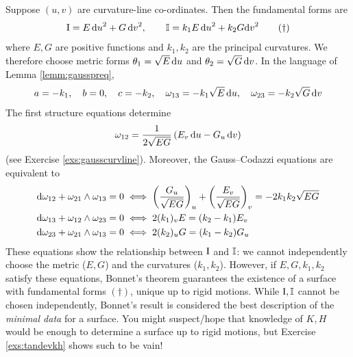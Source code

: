  
 Suppose $(u,v)$ are curvature-line co-ordinates. Then the fundamental forms are
\[
	\mathrm{I}=E\,{\mathrm{d} u}^2+G\,{\mathrm{d} v}^2,\qquad \mathbb{I}=k_1E\,{\mathrm{d} u}^2+k_2 G{\mathrm{d} v}^2\tag{$\dag$}
\]
where $E,G$ are positive functions and $k_1,k_2$ are the principal curvatures. We therefore choose metric forms $\theta_1=\sqrt E\,{\mathrm{d} u}$ and $\theta_2=\sqrt G\,{\mathrm{d} v}$. In the language of Lemma \ref{lemm:gausspreq},
\[
	a=-k_1,\quad b=0,\quad c=-k_2,\quad \omega_{13}=-k_1\sqrt E\,{\mathrm{d} u},\quad\omega_{23}=-k_2\sqrt G\,{\mathrm{d} v}
\]
The first structure equations determine 
\[
	\omega_{12}= \frac 1{2\sqrt{EG}}\left(E_v\,{\mathrm{d} u} -G_u\,{\mathrm{d} v}\right)
\]
(see Exercise \ref{exs:gausscurvline}). Moreover, the Gauss--Codazzi equations are equivalent to
\begin{align*}
	\mathrm{d}\omega_{12}+\omega_{21}\wedge\omega_{13}=0&\iff \left(\frac{G_u}{\sqrt{EG}}\right)_u+\left(\frac{E_v}{\sqrt{EG}}\right)_v =-2k_1k_2\sqrt{EG}\\
	\mathrm{d}\omega_{13}+\omega_{12}\wedge\omega_{23}=0&\iff 2(k_1)_vE=(k_2-k_1)E_v\\
	\mathrm{d}\omega_{23}+\omega_{21}\wedge\omega_{13}=0&\iff 2(k_2)_uG=(k_1-k_2)G_u
\end{align*}
These equations show the relationship between $\mathrm{I}$ and $\mathbb{I}$: we cannot independently choose the metric ($E,G$) and the curvatures ($k_1,k_2$). However, if $E,G,k_1,k_2$ satisfy these equations, Bonnet's theorem guarantees the existence of a surface with fundamental forms $(\dag)$, unique up to rigid motions.\smallbreak
While $\mathrm{I},\mathbb{I}$ cannot be chosen independently, Bonnet's result is considered the best description of the \emph{minimal data} for a surface. You might suspect/hope that knowledge of $K,H$ would be enough to determine a surface up to rigid motions, but Exercise \ref{exs:tandevkh} shows such to be vain!

\goodbreak


